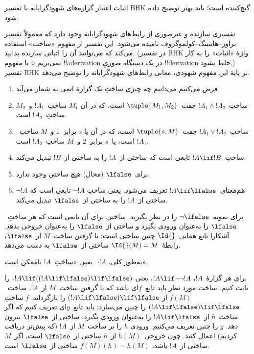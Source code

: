 \documentclass[../../../include/open-logic-section]{subfiles}
\begin{document}


\begin{editorial}
  اثبات اعتبار گزاره‌های شهودگرایانه با تفسیر BHK گیج‌کننده است؛ باید
  بهتر توضیح داده شود.
\end{editorial}

تفسیری سازنده و غیرصوری از رابط‌های شهودگرایانه وجود دارد که معمولاً
تفسیر براور--هایتینگ--کولموگروف نامیده می‌شود. این تفسیر از مفهوم
«ساخت» استفاده می‌کند که می‌توانید آن را اثباتی سازنده بدانید. (در
تفسیر BHK واژهٔ «اثبات» را به کار نمی‌بریم تا با مفهوم
!!a{derivation} در یک دستگاه صوریِ !!{derivation} خلط نشود.) تفسیر BHK
بر پایهٔ این مفهوم شهودی، معانی رابط‌های شهودگرایانه را توضیح می‌دهد.

\begin{enumerate}
\item فرض می‌کنیم می‌دانیم چه چیزی ساختِ یک گزارهٔ اتمی به شمار می‌آید.
\item ساختِ~$!A_1 \land !A_2$ جفت~$\tuple{M_1, M_2}$ است، که در آن
  $M_1$ ساختِ~$!A_1$ و~$M_2$ ساختِ~$!A_2$ است.
\item ساختِ~$!A_1 \lor !A_2$ جفت~$\tuple{s, M}$ است، که در آن یا
  $s$ برابر~$1$ و~$M$ ساختِ~$!A_1$ است، یا~$s$ برابر~$2$ و~$M$
  ساختِ~$!A_2$ است.
\item ساختِ~$!A \lif !B$ تابعی است که ساختی از~$!A$ را به ساختی
  از~$!B$ تبدیل می‌کند.
\item برای~$\lfalse$ (محال) هیچ ساختی وجود ندارد.
\item $\lnot !A$ هم‌معنای~$!A \lif \lfalse$ تعریف می‌شود. یعنی ساختِ
  $\lnot !A$ تابعی است که ساختی از~$!A$ را به ساختی از~$\lfalse$
  تبدیل می‌کند.
\end{enumerate}

\begin{ex}
برای نمونه~$\lnot \lfalse$ را در نظر بگیرید. ساختی برای آن تابعی است
که هر ساختِ~$\lfalse$ را به‌عنوان ورودی بگیرد و ساختی از~$\lfalse$ را
به‌عنوان خروجی بدهد. آشکارا تابع همانی~$\Id{}$ چنین ساختی است: با گرفتن
ساخت~$M$ از~$\lfalse$، رابطهٔ~$\Id{}(M) = M$ ساختی از~$\lfalse$
به دست می‌دهد.
\end{ex}

به‌طور کلی، $\lnot !A$ یعنی «ساختِ~$!A$ ناممکن است».

\begin{ex}
برای هر گزارهٔ~$!A$، $!A \lif \lnot \lnot !A$، یعنی
$!A \lif ((!A \lif \lfalse) \lif \lfalse)$، را ثابت کنیم. ساخت مورد
نظر باید تابع~$f$ای باشد که با گرفتن ساخت~$M$ از~$!A$، ساخت~$f(M)$ از
$(!A \lif \lfalse) \lif \lfalse$ را بازگرداند. $f$ ساختِ
$(!A \lif \lfalse) \lif \lfalse$ را چنین می‌سازد: باید تابع~$g$ای
تعریف کنیم که اگر ساخت~$h$ از~$!A \lif \lfalse$ را به‌عنوان ورودی
بگیرد، ساختی از~$\lfalse$ بیرون دهد. $g$ را چنین تعریف می‌کنیم: ورودی
$h$ را بر ساخت~$M$ از~$!A$ (که پیش‌تر دریافت کردیم) اعمال کنید. چون
خروجی~$h(M)$ از~$h$ ساختی از~$\lfalse$ است، اگر~$M$ ساختی از~$!A$
باشد، $f(M)(h) = h(M)$ ساختی از~$\lfalse$ است.
\end{ex}
\end{document}
